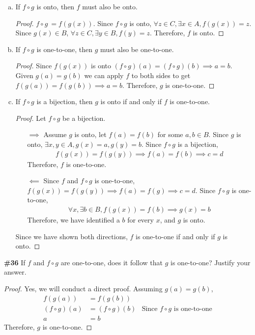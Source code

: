 \documentclass{article}
\newcommand{\problem}[1]{\textbf{\##1}}
\newcommand{\prob}[1]{\problem{#1}}
\begin{document}
\begin{enumerate}[a)]
    \item If \(f \circ g\) is onto, then \(f\) must also be onto.
    \begin{proof}
        \(f \circ g\ = f(g(x))\). Since \(f \circ g\) is onto, \(\forall z \in C, \exists x \in A, f(g(x)) = z\). Since \(g(x) \in B\), \(\forall z \in C, \exists y \in B, f(y) = z\). Therefore, \(f\) is onto.
    \end{proof}
    \item If \(f \circ g\) is one-to-one, then \(g\) must also be one-to-one.
    \begin{proof}
        Since \(f(g(x))\) is onto \((f \circ g)(a) = (f \circ g)(b) \implies a=b\). Given \(g(a) = g(b)\) we can apply \(f\) to both sides to get \(f(g(a)) = f(g(b)) \implies a=b\). Therefore, \(g\) is one-to-one.
    \end{proof}
    \item If \(f \circ g\) is a bijection, then \(g\) is onto if and only if \(f\) is one-to-one.
    \begin{proof}
        Let \(f \circ g\) be a bijection.
        \begin{enumerate}
            \item[\(\implies\)] Assume \(g\) is onto, let \(f(a) = f(b)\) for some \(a,b \in B\). Since \(g\) is onto, \(\exists x,y \in A, g(x) = a, g(y) = b\). Since \(f \circ g\) is a bijection, \begin{align*}
                f(g(x)) = f(g(y)) \implies f(a) = f(b) \implies c = d
            \end{align*} Therefore, \(f\) is one-to-one.
            \item[\(\impliedby\)] Since \(f\) and \(f\circ g\) is one-to-one, \(f(g(x)) = f(g(y)) \implies f(a) = f(g) \implies c = d \). Since \(f \circ g\) is one-to-one,\begin{align*}
                 \forall x, \exists b \in B, f(g(x)) = f(b) \implies g(x) = b
            \end{align*} Therefore, we have identified a \(b\) for every \(x\), and \(g\) is onto.
        \end{enumerate}
        Since we have shown both directions, \(f\) is one-to-one if and only if \(g\) is onto.
    \end{proof}
\end{enumerate}
\pagebreak

\prob{36} If \(f\) and \(f \circ g\) are one-to-one, does it follow that \(g\) is one-to-one? Justify your answer.\\
\begin{proof}
    Yes, we will conduct a direct proof. Assuming \(g(a) = g(b)\),
    \begin{align*}
        f(g(a)) &= f(g(b))\\
        (f \circ g)(a) &= (f \circ g)(b)&\text{Since }f\circ g \text{ is one-to-one}\\
        a &= b
    \end{align*}
    Therefore, \(g\) is one-to-one.
\end{proof}
\pagebreak
\end{document}
